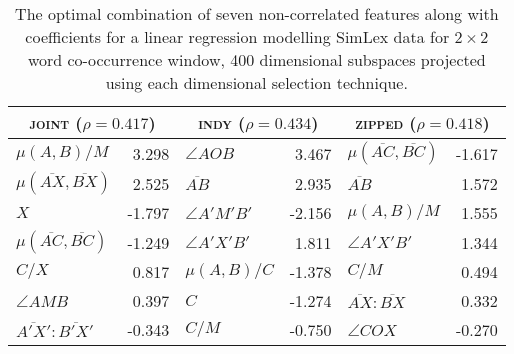 
\begin{table}
\centering
\begin{tabular}{lr|lr|lr}
\hline
\multicolumn{2}{c}{\textsc{joint} ($\rho = 0.417$)} & \multicolumn{2}{c}{\textsc{indy} ($\rho = 0.434$)} & \multicolumn{2}{c}{\textsc{zipped} ($\rho = 0.418$)} \\
\hline
$\mu(A,B)/M$ & 3.298 & $\angle AOB$ & 3.467 & $\mu(\overline{AC},\overline{BC})$ & -1.617 \\
$\mu(\overline{AX},\overline{BX})$ & 2.525 & $\overline{AB}$ & 2.935 & $\overline{AB}$ & 1.572 \\
$X$ & -1.797 & $\angle A'M'B'$ & -2.156 & $\mu(A,B)/M$ & 1.555 \\
$\mu(\overline{AC},\overline{BC})$ & -1.249 & $\angle A'X'B'$ & 1.811 & $\angle A'X'B'$ & 1.344 \\
$C/X$ & 0.817 & $\mu(A,B)/C$ & -1.378 & $C/M$ & 0.494 \\
$\angle AMB$ & 0.397 & $C$ & -1.274 & $\overline{AX}:\overline{BX}$ & 0.332 \\
$\overline{A'X'}:\overline{B'X'}$ & -0.343 & $C/M$ & -0.750 & $\angle COX$ & -0.270 \\
\hline
\end{tabular}
\caption[Optimal Feature Vectors for Similarity]{The optimal combination of seven non-correlated features along with coefficients for a linear regression modelling SimLex data for $2 \times 2$ word co-occurrence window, 400 dimensional subspaces projected using each dimensional selection technique.}
\label{tab:fivelated}
\end{table}

